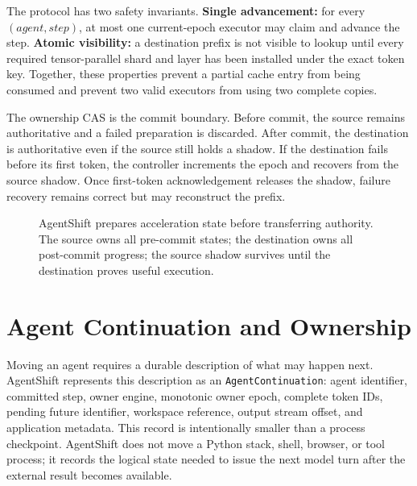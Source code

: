 The protocol has two safety invariants. \textbf{Single advancement:} for every \((agent, step)\), at most one current-epoch executor may claim and advance the step. \textbf{Atomic visibility:} a destination prefix is not visible to lookup until every required tensor-parallel shard and layer has been installed under the exact token key. Together, these properties prevent a partial cache entry from being consumed and prevent two valid executors from using two complete copies.

The ownership CAS is the commit boundary. Before commit, the source remains authoritative and a failed preparation is discarded. After commit, the destination is authoritative even if the source still holds a shadow. If the destination fails before its first token, the controller increments the epoch and recovers from the source shadow. Once first-token acknowledgement releases the shadow, failure recovery remains correct but may reconstruct the prefix.

\begin{figure}[t]
  \centering
  \caption{AgentShift prepares acceleration state before transferring authority. The source owns all pre-commit states; the destination owns all post-commit progress; the source shadow survives until the destination proves useful execution.}
  \label{fig:protocol}
\end{figure}

\section{Agent Continuation and Ownership}\label{agent-continuation-and-ownership}

Moving an agent requires a durable description of what may happen next. AgentShift represents this description as an \texttt{AgentContinuation}: agent identifier, committed step, owner engine, monotonic owner epoch, complete token IDs, pending future identifier, workspace reference, output stream offset, and application metadata. This record is intentionally smaller than a process checkpoint. AgentShift does not move a Python stack, shell, browser, or tool process; it records the logical state needed to issue the next model turn after the external result becomes available.

